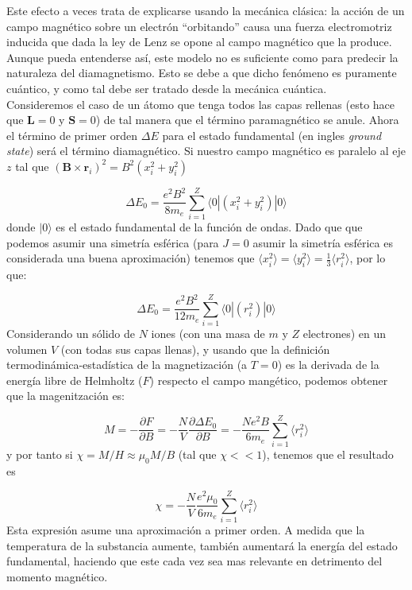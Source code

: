 \documentclass[12pt,a4paper]{book}
\numberwithin{equation}{section}
\numberwithin{figure}{section}
\newcommand{\parciales}[2]{\frac{\partial #1}{\partial #2}}
\newcommand{\rn}{\mathbf{r}}
\newcommand{\Bn}{\mathbf{B}}
\newcommand{\Ln}{\mathbf{L}}
\newcommand{\Sn}{\mathbf{S}}
\begin{document}
Este efecto a veces trata de explicarse usando la mecánica clásica: la acción de un campo magnético sobre un electrón ``orbitando'' causa una fuerza electromotriz inducida que dada la ley de Lenz se opone al campo magnético que la produce. Aunque pueda entenderse así, este modelo no es suficiente como para predecir la naturaleza del diamagnetismo. Esto se debe a que dicho fenómeno es puramente cuántico, y como tal debe ser tratado desde la mecánica cuántica. \\

Consideremos el caso de un átomo que tenga todos las capas rellenas (esto hace que $\Ln = 0$ y $\Sn = 0$) de tal manera que el término paramagnético se anule. Ahora el término de primer orden $\Delta E$ para el estado fundamental (en ingles \textit{ground state}) será el término diamagnético. Si nuestro campo magnético es paralelo al eje $z$ tal que $(\Bn \times \rn_i)^2 = B^2 (x_i^2+y_i^2)$

\begin{equation}
\Delta E_0 = \frac{e^2 B^2}{8 m_e} \sum_{i=1}^Z \langle 0 | (x_i^2+y_i^2) | 0 \rangle 
\end{equation}
donde $|0\rangle$ es el estado fundamental de la función de ondas. Dado que  que podemos asumir una simetría esférica (para $J=0$ asumir la simetría esférica es considerada una buena aproximación) tenemos que $\langle x_i^2 \rangle = \langle y_i^2 \rangle = \frac{1}{3} \langle r_i^2 \rangle$, por lo que:

\begin{equation}
\Delta E_0 = \frac{e^2 B^2}{12 m_e} \sum_{i=1}^Z \langle 0 | (r_i^2) | 0 \rangle 
\end{equation}
Considerando un sólido de $N$ iones (con una masa de $m$ y $Z$ electrones) en un volumen $V$ (con todas sus capas llenas), y usando que la definición termodinámica-estadística de la magnetización (a $T=0$) es la derivada de la energía libre de Helmholtz ($F$) respecto el campo mangético, podemos obtener que la magenitzación es:

\begin{equation}
M = - \parciales{F}{B} = - \frac{N}{V} \parciales{\Delta E_0}{B} = - \frac{N e^2 B}{6 m_e} \sum_{i=1}^Z \langle r_i^2 \rangle
\end{equation}
y por tanto si $\chi = M / H \approx \mu_0 M / B$ (tal que $\chi << 1$), tenemos que el resultado es

\begin{equation}
\chi = - \frac{N}{V} \frac{ e^2 \mu_0}{6 m_e} \sum_{i=1}^Z \langle r_i^2 \rangle \label{Ec:02-03-004}
\end{equation}
Esta expresión asume una aproximación a primer orden. A medida que la temperatura de la substancia aumente, también aumentará la energía del estado fundamental, haciendo que este cada vez sea mas relevante en detrimento del momento magnético.   \\
\end{document}
